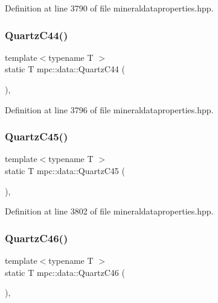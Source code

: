 Definition at line 3790 of file mineraldataproperties.\+hpp.

\mbox{\label{namespacempc_1_1data_ad5a967f86f566d876049b0b0b4057f96}} 
\subsubsection{\texorpdfstring{Quartz\+C44()}{QuartzC44()}}
{\footnotesize\ttfamily template$<$typename T $>$ \\
static T mpc\+::data\+::\+Quartz\+C44 (\begin{DoxyParamCaption}{ }\end{DoxyParamCaption})\hspace{0.3cm}{\ttfamily [inline]}, {\ttfamily [static]}}



Definition at line 3796 of file mineraldataproperties.\+hpp.

\mbox{\label{namespacempc_1_1data_a4c87e86635514d7267a28a1dd9d5fcd2}} 
\subsubsection{\texorpdfstring{Quartz\+C45()}{QuartzC45()}}
{\footnotesize\ttfamily template$<$typename T $>$ \\
static T mpc\+::data\+::\+Quartz\+C45 (\begin{DoxyParamCaption}{ }\end{DoxyParamCaption})\hspace{0.3cm}{\ttfamily [inline]}, {\ttfamily [static]}}



Definition at line 3802 of file mineraldataproperties.\+hpp.

\mbox{\label{namespacempc_1_1data_a57bcf46b8e0fd3057742dd40a70f3298}} 
\subsubsection{\texorpdfstring{Quartz\+C46()}{QuartzC46()}}
{\footnotesize\ttfamily template$<$typename T $>$ \\
static T mpc\+::data\+::\+Quartz\+C46 (\begin{DoxyParamCaption}{ }\end{DoxyParamCaption})\hspace{0.3cm}{\ttfamily [inline]}, {\ttfamily [static]}}



